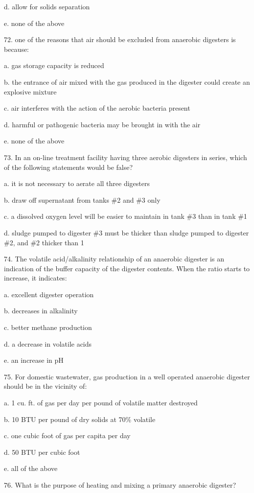\documentclass{article}
\begin{document}
d. allow for solids separation 

e. none of the above 


72. one of the reasons that air should be excluded from anaerobic digesters is because: 

a. gas storage capacity is reduced 

b. the entrance of air mixed with the gas produced in the digester could create an explosive mixture 

c. air interferes with the action of the aerobic bacteria present 

d. harmful or pathogenic bacteria may be brought in with the air 

e. none of the above 


73. In an on-line treatment facility having three aerobic digesters in series, which of the following statements would be false? 

a. it is not necessary to aerate all three digesters 

b. draw off supernatant from tanks \#2 and \#3 only 

c. a dissolved oxygen level will be easier to maintain in tank \#3 than in tank \#1 

d. sludge pumped to digester \#3 must be thicker than sludge pumped to digester \#2, and \#2 thicker than 1 


74. The volatile acid/alkalinity relationship of an anaerobic digester is an indication of the buffer capacity of the digester contents. When the ratio starts to increase, it indicates: 

a. excellent digester operation 

b. decreases in alkalinity 

c. better methane production 

d. a decrease in volatile acids 

e. an increase in pH 


75. For domestic wastewater, gas production in a well operated anaerobic digester should be in the vicinity of: 

a. 1 cu. ft. of gas per day per pound of volatile matter destroyed 

b. 10 BTU per pound of dry solids at 70\% volatile 

c. one cubic foot of gas per capita per day 

d. 50 BTU per cubic foot 

e. all of the above 


76. What is the purpose of heating and mixing a primary anaerobic digester? 
\end{document}
